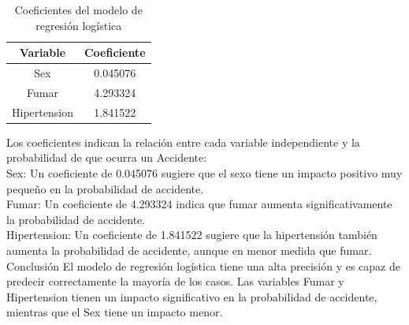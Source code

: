 \documentclass[a4paper, 12pt]{article}
\begin{document}
\begin{table}[H]
    \centering
    \begin{tabular}{|c|c|}
        \hline
        Variable & Coeficiente \\ \hline
        Sex & 0.045076 \\ \hline
        Fumar & 4.293324 \\ \hline
        Hipertension & 1.841522 \\ \hline
    \end{tabular}
    \caption{Coeficientes del modelo de regresión logística}
    \label{tab:coeficientes_modelo}
\end{table}

Los coeficientes indican la relación entre cada variable independiente y la probabilidad de que ocurra un Accidente:
\\
Sex: Un coeficiente de 0.045076 sugiere que el sexo tiene un impacto positivo muy pequeño en la probabilidad de accidente.
\\
Fumar: Un coeficiente de 4.293324 indica que fumar aumenta significativamente la probabilidad de accidente.
\\
Hipertension: Un coeficiente de 1.841522 sugiere que la hipertensión también aumenta la probabilidad de accidente, aunque en menor medida que fumar.
\\
Conclusión
El modelo de regresión logística tiene una alta precisión y es capaz de predecir correctamente 
la mayoría de los casos. Las variables Fumar y Hipertension tienen un impacto significativo en 
la probabilidad de accidente, mientras que el Sex tiene un impacto menor.
\end{document}
